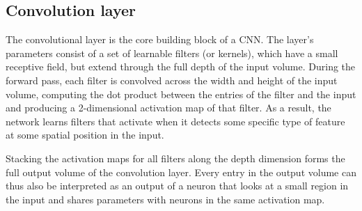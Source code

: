 \documentclass[11pt]{article}
\begin{document}
\subsection{Convolution layer}
The convolutional layer is the core building block of a CNN. The layer's parameters consist of a set of learnable filters (or kernels), which have a small receptive field, but extend through the full depth of the input volume. During the forward pass, each filter is convolved across the width and height of the input volume, computing the dot product between the entries of the filter and the input and producing a 2-dimensional activation map of that filter. As a result, the network learns filters that activate when it detects some specific type of feature at some spatial position in the input.

Stacking the activation maps for all filters along the depth dimension forms the full output volume of the convolution layer. Every entry in the output volume can thus also be interpreted as an output of a neuron that looks at a small region in the input and shares parameters with neurons in the same activation map.
\end{document}

